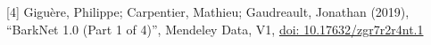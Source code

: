 \documentclass{article}
\begin{document}
[4] Giguère, Philippe; Carpentier, Mathieu; Gaudreault, Jonathan (2019), “BarkNet 1.0 (Part 1 of  4)”, Mendeley Data, V1, \url{doi: 10.17632/zgr7r2r4nt.1}



\end{document}
